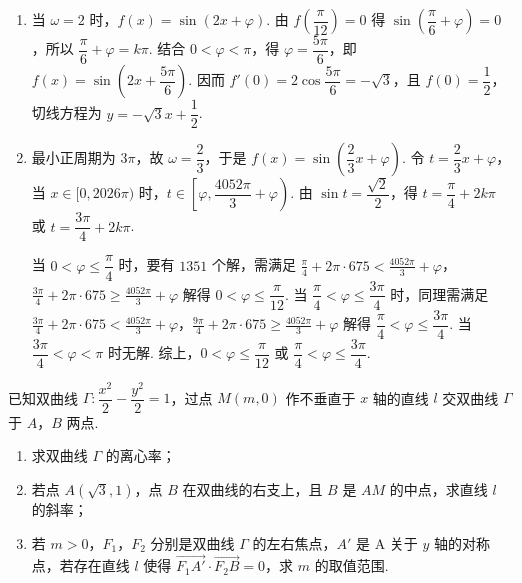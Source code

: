 \begin{solution}
\begin{enumerate}
\item 当 \(\omega=2\) 时，\(f(x)=\sin(2x+\varphi)\). 由 \(f\left(\dfrac{\pi}{12}\right)=0\) 得 \(\sin\left(\dfrac{\pi}{6}+\varphi\right)=0\)，所以 \(\dfrac{\pi}{6}+\varphi=k\pi\). 结合 \(0<\varphi<\pi\)，得 \(\varphi=\dfrac{5\pi}{6}\)，即 \(f(x)=\sin\left(2x+\dfrac{5\pi}{6}\right)\). 因而 \(f'(0)=2\cos\dfrac{5\pi}{6}=-\sqrt3\)，且 \(f(0)=\dfrac12\)，切线方程为 \(y=-\sqrt3x+\dfrac12\).

\item 最小正周期为 \(3\pi\)，故 \(\omega=\dfrac23\)，于是 \(f(x)=\sin\left(\dfrac23x+\varphi\right)\). 令 \(t=\dfrac23x+\varphi\)，当 \(x\in[0,2026\pi)\) 时，\(t\in\left[\varphi,\dfrac{4052\pi}{3}+\varphi\right)\). 由 \(\sin t=\dfrac{\sqrt2}{2}\)，得 \(t=\dfrac{\pi}{4}+2k\pi\) 或 \(t=\dfrac{3\pi}{4}+2k\pi\).

当 \(0<\varphi\le\dfrac{\pi}{4}\) 时，要有 \(1351\) 个解，需满足
\(\frac{\pi}{4}+2\pi\cdot675<\frac{4052\pi}{3}+\varphi\)，\(\frac{3\pi}{4}+2\pi\cdot675\ge\frac{4052\pi}{3}+\varphi\)
解得 \(0<\varphi\le\dfrac{\pi}{12}\). 当 \(\dfrac{\pi}{4}<\varphi\le\dfrac{3\pi}{4}\) 时，同理需满足
\(\frac{3\pi}{4}+2\pi\cdot675<\frac{4052\pi}{3}+\varphi\)，\(\frac{9\pi}{4}+2\pi\cdot675\ge\frac{4052\pi}{3}+\varphi\)
解得 \(\dfrac{\pi}{4}<\varphi\le\dfrac{3\pi}{4}\). 当 \(\dfrac{3\pi}{4}<\varphi<\pi\) 时无解. 综上，\(0<\varphi\le\dfrac{\pi}{12}\) 或 \(\dfrac{\pi}{4}<\varphi\le\dfrac{3\pi}{4}\).
\end{enumerate}
\end{solution}

\begin{problem}
已知双曲线 \(\Gamma:\dfrac{x^2}{2}-\dfrac{y^2}{2}=1\)，过点 \(M(m,0)\) 作不垂直于 \(x\) 轴的直线 \(l\) 交双曲线 \(\Gamma\) 于 \(A\)，\(B\) 两点.

\begin{enumerate}
\item 求双曲线 \(\Gamma\) 的离心率；
\item 若点 \(A(\sqrt3,1)\)，点 \(B\) 在双曲线的右支上，且 \(B\) 是 \(AM\) 的中点，求直线 \(l\) 的斜率；
\item 若 \(m>0\)，\(F_1\)，\(F_2\) 分别是双曲线 \(\Gamma\) 的左右焦点，\(A'\) 是 A 关于 \(y\) 轴的对称点，若存在直线 \(l\) 使得 \(\overrightarrow{F_1A'}\cdot\overrightarrow{F_2B}=0\)，求 \(m\) 的取值范围.
\end{enumerate}
\end{problem}

